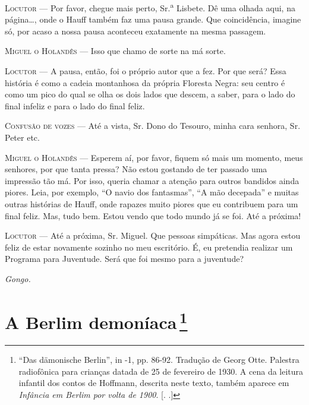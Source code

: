 \textsc{Locutor} --- Por favor, chegue mais perto, Sr.\textsuperscript{a} Lisbete.
Dê uma olhada aqui, na página\ldots{}, onde o Hauff também faz uma pausa
grande. Que coincidência, imagine só, por acaso a nossa pausa aconteceu
exatamente na mesma passagem.

\textsc{Miguel o Holandês} --- Isso que chamo de sorte na má sorte.

\textsc{Locutor} --- A pausa, então, foi o próprio autor que a fez. Por que será?
Essa história é como a cadeia montanhosa da própria Floresta Negra: seu
centro é como um pico do qual se olha os dois lados que descem, a saber,
para o lado do final infeliz e para o lado do final feliz.

\textsc{Confusão de vozes} --- Até a vista, Sr. Dono do Tesouro, minha cara
senhora, Sr. Peter etc.

\textsc{Miguel o Holandês} --- Esperem aí, por favor, fiquem só mais um momento,
meus senhores, por que tanta pressa? Não estou gostando de ter passado
uma impressão tão má. Por isso, queria chamar a atenção para outros
bandidos ainda piores. Leia, por exemplo, ``O navio dos fantasmas'', ``A
mão decepada'' e muitas outras histórias de Hauff, onde rapazes muito
piores que eu contribuem para um final feliz. Mas, tudo bem. Estou vendo
que todo mundo já se foi. Até a próxima!

\textsc{Locutor} --- Até a próxima, Sr. Miguel. Que pessoas simpáticas. Mas agora
estou feliz de estar novamente sozinho no meu escritório. É, eu
pretendia realizar um Programa para Juventude. Será que foi mesmo para a
juventude?

\emph{Gongo.}

\chapter{A Berlim demoníaca\,\footnote[*]{``Das dämonische Berlin'',
  in  -1, pp. 86-92. Tradução de Georg Otte. Palestra radiofônica
  para crianças datada de 25 de fevereiro de 1930. A cena da leitura
  infantil dos contos de  Hoffmann, descrita neste texto, também
  aparece em \emph{Infância em Berlim por volta de 1900}. [. .]} }

